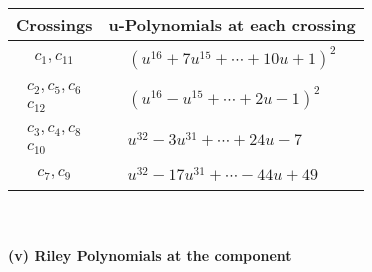 \documentclass[1p]{elsarticle_modified}
\theoremstyle{definition}
\begin{document}
\begin{tabular}{m{50pt}|m{274pt}}
Crossings & \hspace{64pt}u-Polynomials at each crossing \\
\hline $$\begin{aligned}c_{1},c_{11}\end{aligned}$$&$\begin{aligned}
&(u^{16}+7 u^{15}+\cdots+10 u+1)^{2}
\end{aligned}$\\
\hline $$\begin{aligned}c_{2},c_{5},c_{6}\\c_{12}\end{aligned}$$&$\begin{aligned}
&(u^{16}- u^{15}+\cdots+2 u-1)^{2}
\end{aligned}$\\
\hline $$\begin{aligned}c_{3},c_{4},c_{8}\\c_{10}\end{aligned}$$&$\begin{aligned}
&u^{32}-3 u^{31}+\cdots+24 u-7
\end{aligned}$\\
\hline $$\begin{aligned}c_{7},c_{9}\end{aligned}$$&$\begin{aligned}
&u^{32}-17 u^{31}+\cdots-44 u+49
\end{aligned}$\\
\hline
\end{tabular}\\~\\
\newpage\renewcommand{\arraystretch}{1}
\flushleft \textbf{(v) Riley Polynomials at the component}\newline \\
\end{document}
